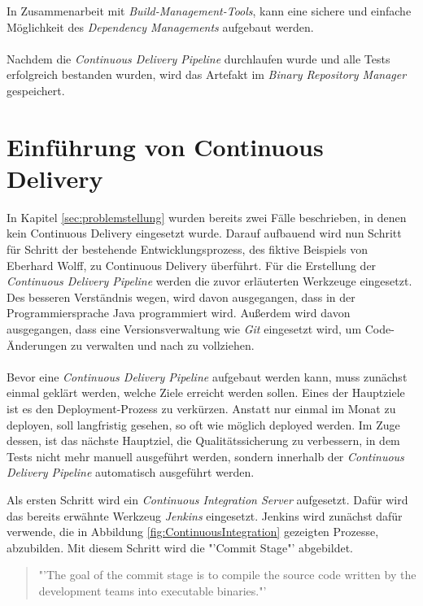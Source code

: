In Zusammenarbeit mit \textit{Build-Management-Tools}, kann eine sichere und einfache Möglichkeit des \textit{Dependency Managements} aufgebaut werden.
\\\\
Nachdem die \textit{Continuous Delivery Pipeline} durchlaufen wurde und alle Tests erfolgreich bestanden wurden, wird das Artefakt im \textit{Binary Repository Manager} gespeichert.

\section{Einführung von Continuous Delivery}
\label{sec:EinfuehrungCD}
In Kapitel \ref{sec:problemstellung}  wurden bereits zwei Fälle beschrieben, in denen kein Continuous Delivery eingesetzt wurde. Darauf aufbauend wird nun Schritt für Schritt der bestehende Entwicklungsprozess, des fiktive Beispiels von Eberhard Wolff, zu Continuous Delivery überführt. Für die Erstellung der \textit{Continuous Delivery Pipeline} werden die zuvor erläuterten Werkzeuge eingesetzt. Des besseren Verständnis wegen, wird davon ausgegangen, dass in der Programmiersprache Java programmiert wird. Außerdem wird davon ausgegangen, dass eine Versionsverwaltung wie \textit{Git} eingesetzt wird, um Code-Änderungen zu verwalten und nach zu vollziehen.
\\\\
Bevor eine \textit{Continuous Delivery Pipeline} aufgebaut werden kann, muss zunächst einmal geklärt werden, welche Ziele erreicht werden sollen. Eines der Hauptziele ist es den Deployment-Prozess zu verkürzen. Anstatt nur einmal im Monat zu deployen, soll langfristig gesehen, so oft wie möglich deployed werden. Im Zuge dessen, ist das nächste Hauptziel, die Qualitätssicherung zu verbessern, in dem Tests nicht mehr manuell ausgeführt werden, sondern innerhalb der \textit{Continuous Delivery Pipeline} automatisch ausgeführt werden.

Als ersten Schritt wird ein \textit{Continuous Integration Server} aufgesetzt. Dafür wird das bereits erwähnte Werkzeug \textit{Jenkins} eingesetzt. Jenkins wird zunächst dafür verwende, die in Abbildung \ref{fig:ContinuousIntegration}  gezeigten Prozesse, abzubilden. Mit diesem Schritt wird die "'Commit Stage"' abgebildet.

\begin{quote}
    "'The goal of the commit stage is to compile the source code written by the development teams into executable binaries."'\cite{CD:AutomatedTesting}
\end{quote}

